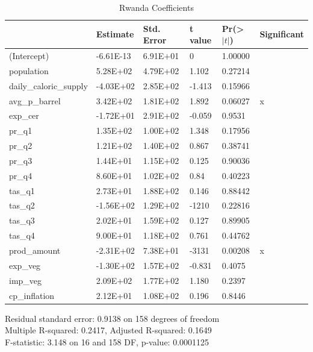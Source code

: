 \documentclass[11pt]{article}
\begin{document}
\FloatBarrier
\begin{table}[!htbp]
\centering
\begin{tabular}{llllll}
\hline
                       & Estimate  & Std. Error & t value & Pr(\textgreater$|t|$) & Significant \\ \hline
(Intercept)            & -6.61E-13 & 6.91E+01   & 0       & 1.00000             &             \\
population             & 5.28E+02  & 4.79E+02   & 1.102   & 0.27214             &             \\
daily\_caloric\_supply & -4.03E+02 & 2.85E+02   & -1.413  & 0.15966             &             \\
avg\_p\_barrel         & 3.42E+02  & 1.81E+02   & 1.892   & 0.06027             & x           \\
exp\_cer               & -1.72E+01 & 2.91E+02   & -0.059  & 0.9531              &             \\
pr\_q1                 & 1.35E+02  & 1.00E+02   & 1.348   & 0.17956             &             \\
pr\_q2                 & 1.21E+02  & 1.40E+02   & 0.867   & 0.38741             &             \\
pr\_q3                 & 1.44E+01  & 1.15E+02   & 0.125   & 0.90036             &             \\
pr\_q4                 & 8.60E+01  & 1.02E+02   & 0.84    & 0.40223             &             \\
tas\_q1                & 2.73E+01  & 1.88E+02   & 0.146   & 0.88442             &             \\
tas\_q2                & -1.56E+02 & 1.29E+02   & -1210   & 0.22816             &             \\
tas\_q3                & 2.02E+01  & 1.59E+02   & 0.127   & 0.89905             &             \\
tas\_q4                & 9.00E+01  & 1.18E+02   & 0.761   & 0.44762             &             \\
prod\_amount           & -2.31E+02 & 7.38E+01   & -3131   & 0.00208             & x           \\
exp\_veg               & -1.30E+02 & 1.57E+02   & -0.831  & 0.4075              &             \\
imp\_veg               & 2.09E+02  & 1.77E+02   & 1.180   & 0.2397              &             \\
cp\_inflation          & 2.12E+01  & 1.08E+02   & 0.196   & 0.8446              &            \\ \hline
\end{tabular}
\caption{Rwanda Coefficients}
\label{table16}
\end{table}
\FloatBarrier
Residual standard error: 0.9138 on 158 degrees of freedom \\
Multiple R-squared:  0.2417,	Adjusted R-squared:  0.1649 \\
F-statistic: 3.148 on 16 and 158 DF,  p-value: 0.0001125
\end{document}
